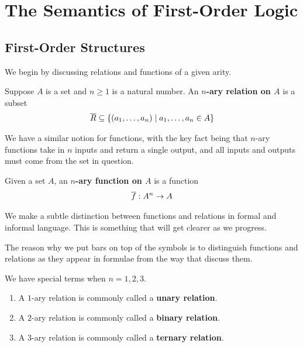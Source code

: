 \section{The Semantics of First-Order Logic}

\subsection{First-Order Structures}

We begin by discussing relations and functions of a given arity.

\begin{boxdefinition}
    Suppose $A$ is a set and $n \geq 1$ is a natural number. An \textbf{$n$-ary relation on $A$} is a subset
    \begin{align*}
        \overline{R} \subseteq \left\{ \left( a_1, \ldots, a_n \right) \; \middle\vert \; a_1, \ldots, a_n \in A \right\}
    \end{align*}
\end{boxdefinition}

We have a similar notion for functions, with the key fact being that $n$-ary functions take in $n$ inputs and return a single output, and all inputs and outputs must come from the set in question.

\begin{boxdefinition}
    Given a set $A$, an \textbf{$n$-ary function on $A$} is a function
    \begin{align*}
        \overline{f}: A^n \to A
    \end{align*}
\end{boxdefinition}

We make a subtle distinction between functions and relations in formal and informal language. This is something that will get clearer as we progress.

\begin{boxconvention}
    The reason why we put bars on top of the symbols is to distinguish functions and relations as they appear in formulae from the way that discuss them.
\end{boxconvention}

We have special terms when $n = 1, 2, 3$.

\begin{boxconvention}
    \hfill
    \begin{enumerate}
        \item A $1$-ary relation is commonly called a \textbf{unary relation}.
        \item A $2$-ary relation is commonly called a \textbf{binary relation}.
        \item A $3$-ary relation is commonly called a \textbf{ternary relation}.
    \end{enumerate}
\end{boxconvention}

